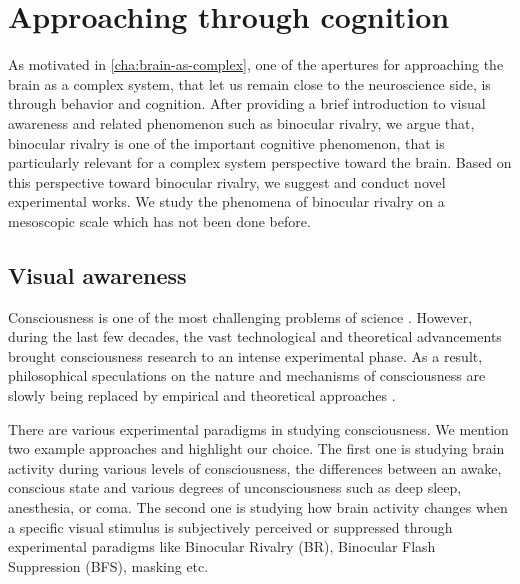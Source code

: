 \chapter{Approaching through cognition} \label{cha:appr-thro-behav}

As motivated in \autoref{cha:brain-as-complex},
one of the apertures for approaching the brain as a complex system,
that let us remain close to the neuroscience side, is 
through behavior and cognition.
% 
After providing a brief introduction to visual awareness and related phenomenon such as binocular rivalry, 
% 
we argue that,
binocular rivalry is one of the important cognitive phenomenon,
that is particularly relevant for a complex system perspective toward the brain.
Based on this perspective toward binocular rivalry,
we suggest and conduct novel experimental works.
We study the phenomena of binocular rivalry on a mesoscopic scale which has not been done before.


\section{Visual awareness} %
Consciousness is one of the most challenging problems of science
\cite{christofQuestConsciousnessNeurobiological2004}.
However, during the last few decades, the vast technological and theoretical advancements brought consciousness research to an intense experimental phase. 
As a result, philosophical speculations on the nature and mechanisms of consciousness are slowly being replaced by empirical and theoretical approaches \cite{logothetisVisionWindowConsciousness2006,tononiNeuralCorrelatesConsciousness2008,christofkochConsciousnessConfessionsRomantic2012}.

There are various experimental paradigms in studying conscious\-ness.
We mention two example approaches and highlight our choice.
The first one is studying brain activity during various levels of conscious\-ness, \ie the differences between an awake, conscious state and various degrees of unconscious\-ness such as deep sleep, anesthesia, or coma.
The second one is studying how brain activity changes when a specific visual stimulus is subject\-ively perceived or supp\-ressed through experim\-ental paradigms like Binocular Rivalry (BR), Binocular Flash Suppression (BFS), masking etc. 

